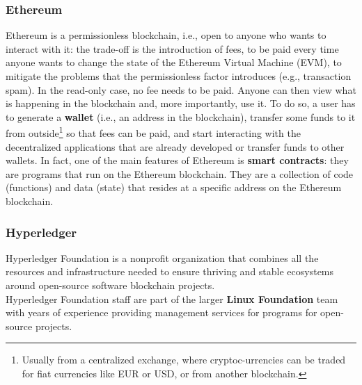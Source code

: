 \subsubsection{Ethereum}
Ethereum\cite{site:ethereum} is a permissionless blockchain, i.e., open to anyone who wants to interact 
with it: the trade-off is the introduction of fees, to be paid every time anyone wants 
to change the state of the Ethereum Virtual Machine (EVM), to mitigate the problems 
that the permissionless factor introduces (e.g., transaction spam). In the read-only 
case, no fee needs to be paid. Anyone can then view what is happening in the blockchain 
and, more importantly, use it. To do so, a user has to generate a \textbf{wallet} (i.e.,
an address in the blockchain), transfer some funds to it from outside\footnote{Usually
from a centralized exchange, where cryptoc-urrencies can be traded for fiat currencies
like EUR or USD, or from another blockchain.} so that fees can be paid, and start 
interacting with the decentralized applications that are already developed or transfer 
funds to other wallets. In fact, one of the main features of Ethereum is \textbf{smart 
contracts}: they are programs that run on the Ethereum blockchain. They are a collection 
of code (functions) and data (state) that resides at a specific address on the 
Ethereum blockchain.
\subsubsection{Hyperledger}
Hyperledger Foundation\cite{site:hyperledger} is a nonprofit organization that combines all the resources and 
infrastructure needed to ensure thriving and stable ecosystems around open-source 
software blockchain projects.\\
Hyperledger Foundation staff are part of the larger \textbf{Linux Foundation} team with
years of experience providing management services for programs for open-source projects.
